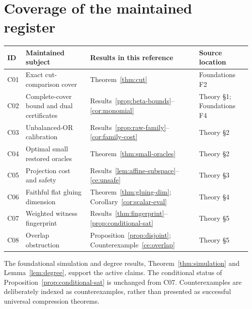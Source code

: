 \documentclass[11pt,letterpaper,oneside]{report}
\theoremstyle{komorebi}
\begin{document}
\section{Coverage of the maintained register}
\small
\begin{longtable}{@{}p{0.40in}p{1.77in}p{2.24in}p{1.40in}@{}}
\toprule
\textbf{ID} & \textbf{Maintained subject} & \textbf{Results in this reference} & \textbf{Source location}\\\midrule\endhead
C01 & Exact cut-comparison cover & Theorem~\ref{thm:cut} & Foundations F2\\
C02 & Complete-cover bound and dual certificates & Results~\ref{prop:beta-bounds}--\ref{cor:monomial} & Theory \S1; Foundations F4\\
C03 & Unbalanced-OR calibration & Results~\ref{prop:raw-family}--\ref{cor:family-cost} & Theory \S2\\
C04 & Optimal small restored oracles & Theorem~\ref{thm:small-oracles} & Theory \S2\\
C05 & Projection cost and safety & Results~\ref{lem:affine-subspace}--\ref{ce:unsafe} & Theory \S3\\
C06 & Faithful flat gluing dimension & Theorem~\ref{thm:gluing-dim}; Corollary~\ref{cor:scalar-eval} & Theory \S4\\
C07 & Weighted witness fingerprint & Results~\ref{thm:fingerprint}--\ref{prop:conditional-sat} & Theory \S5\\
C08 & Overlap obstruction & Proposition~\ref{prop:disjoint}; Counterexample~\ref{ce:overlap} & Theory \S5\\
\bottomrule
\end{longtable}
\normalsize
The foundational simulation and degree results, Theorem~\ref{thm:simulation} and Lemma~\ref{lem:degree}, support the active claims. The conditional status of Proposition~\ref{prop:conditional-sat} is unchanged from C07. Counterexamples are deliberately indexed as counterexamples, rather than presented as successful universal compression theorems.
\end{document}
